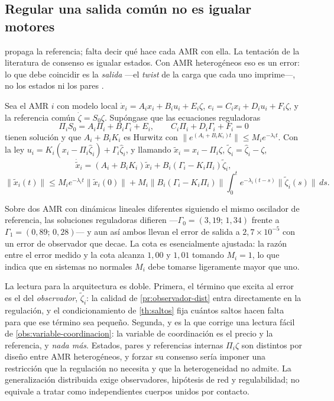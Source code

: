 \subsection{Regular una salida común no es igualar motores}

 propaga la referencia; falta decir qué hace cada AMR
con ella. La tentación de la literatura de consenso es igualar estados. Con AMR
heterogéneos eso es un error: lo que debe coincidir es la \emph{salida} —el
\emph{twist} de la carga que cada uno imprime—, no los estados ni los pares
\cite{mayorga2026m1}.

\begin{proposicion}
\label{pr:regulacion-local}
Sea el AMR $i$ con modelo local $\dot x_i=A_ix_i+B_iu_i+E_i\zeta$,
$e_i=C_ix_i+D_iu_i+F_i\zeta$, y la referencia común $\dot\zeta=S_0\zeta$.
Supóngase que las ecuaciones reguladoras
\[
  \Pi_iS_0=A_i\Pi_i+B_i\Gamma_i+E_i,\qquad C_i\Pi_i+D_i\Gamma_i+F_i=0
\]
tienen solución y que $A_i+B_iK_i$ es Hurwitz con
$\lVert e^{(A_i+B_iK_i)t}\rVert\le M_ie^{-\lambda_it}$. Con la ley
$u_i=K_i(x_i-\Pi_i\hat\zeta_i)+\Gamma_i\hat\zeta_i$, y llamando
$\tilde x_i=x_i-\Pi_i\zeta$, $\tilde\zeta_i=\hat\zeta_i-\zeta$,
\[
  \dot{\tilde x}_i=(A_i+B_iK_i)\tilde x_i+B_i(\Gamma_i-K_i\Pi_i)\tilde\zeta_i,
\]
\[
  \lVert\tilde x_i(t)\rVert\le M_ie^{-\lambda_it}\lVert\tilde x_i(0)\rVert
  +M_i\lVert B_i(\Gamma_i-K_i\Pi_i)\rVert\int_0^{t}e^{-\lambda_i(t-s)}\lVert\tilde\zeta_i(s)\rVert\,ds .
\]
\end{proposicion}

\begin{observacion}
\label{obs:regulacion-num}
Sobre dos AMR con dinámicas lineales diferentes siguiendo el mismo oscilador de
referencia, las soluciones reguladoras difieren —$\Gamma_0=(3{,}19;\,1{,}34)$
frente a $\Gamma_1=(0{,}89;\,0{,}28)$— y aun así ambos llevan el error de salida
a $2{,}7\times10^{-5}$ con un error de observador que decae. La cota es
esencialmente ajustada: la razón entre el error medido y la cota alcanza $1{,}00$
y $1{,}01$ tomando $M_i=1$, lo que indica que en sistemas no normales $M_i$ debe
tomarse ligeramente mayor que uno.

La lectura para la arquitectura es doble. Primera, el término que excita al
error es el del \emph{observador}, $\tilde\zeta_i$: la calidad de
\cref{pr:observador-dist} entra directamente en la regulación, y el
condicionamiento de \cref{th:saltos} fija cuántos saltos hacen falta para que
ese término sea pequeño. Segunda, y es la que corrige una lectura fácil de
\cref{obs:variable-coordinacion}: la variable de coordinación es el precio y la
referencia, y \emph{nada más}. Estados, pares y referencias internas $\Pi_i\zeta$
son distintos por diseño entre AMR heterogéneos, y forzar su consenso sería
imponer una restricción que la regulación no necesita y que la heterogeneidad
no admite. La generalización distribuida exige observadores, hipótesis de red y
regulabilidad; no equivale a tratar como independientes cuerpos unidos por
contacto.
\end{observacion}

